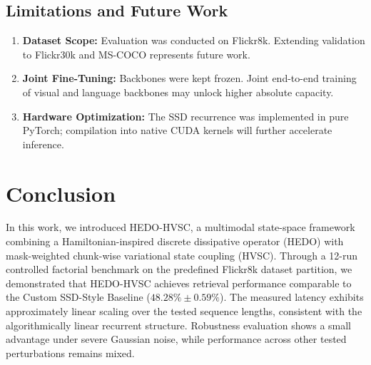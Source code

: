 \documentclass[journal]{IEEEtran}
\begin{document}
\subsection{Limitations and Future Work}
\begin{enumerate}
    \item \textbf{Dataset Scope:} Evaluation was conducted on Flickr8k. Extending validation to Flickr30k \cite{young2014image} and MS-COCO \cite{lin2014microsoft} represents future work.
    \item \textbf{Joint Fine-Tuning:} Backbones were kept frozen. Joint end-to-end training of visual and language backbones may unlock higher absolute capacity.
    \item \textbf{Hardware Optimization:} The SSD recurrence was implemented in pure PyTorch; compilation into native CUDA kernels will further accelerate inference.
\end{enumerate}

\section{Conclusion}
\label{sec:conclusion}
In this work, we introduced HEDO-HVSC, a multimodal state-space framework combining a Hamiltonian-inspired discrete dissipative operator (HEDO) with mask-weighted chunk-wise variational state coupling (HVSC). Through a 12-run controlled factorial benchmark on the predefined Flickr8k dataset partition, we demonstrated that HEDO-HVSC achieves retrieval performance comparable to the Custom SSD-Style Baseline ($48.28\% \pm 0.59\%$). The measured latency exhibits approximately linear scaling over the tested sequence lengths, consistent with the algorithmically linear recurrent structure. Robustness evaluation shows a small advantage under severe Gaussian noise, while performance across other tested perturbations remains mixed.



\end{document}
